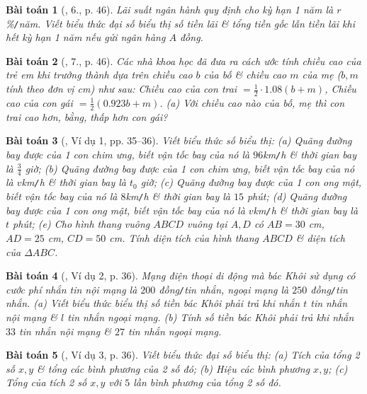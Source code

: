 \documentclass{article}
\newtheorem{baitoan}{Bài toán}
\begin{document}
\begin{baitoan}[\cite{SGK_Toan_7_Canh_Dieu_tap_2}, 6., p. 46]
	Lãi suất ngân hành quy định cho kỳ hạn 1 năm là $r$\%\emph{\texttt{/}}năm. Viết biểu thức đại số biểu thị số tiền lãi \& tổng tiền gốc lẫn tiền lãi khi hết kỳ hạn 1 năm nếu gửi ngân hàng $A$ đồng.
\end{baitoan}

\begin{baitoan}[\cite{SGK_Toan_7_Canh_Dieu_tap_2}, 7., p. 46]
	Các nhà khoa học đã đưa ra cách ước tính chiều cao của trẻ em khi trưởng thành dựa trên chiều cao $b$ của bố \& chiều cao $m$ của mẹ ($b,m$ tính theo đơn vị cm) như sau: Chiều cao của con trai $= \frac{1}{2}\cdot1.08(b + m)$, Chiều cao của con gái $= \frac{1}{2}(0.923b + m)$. (a) Với chiều cao nào của bố, mẹ thì con trai cao hơn, bằng, thấp hơn con gái?
\end{baitoan}

\begin{baitoan}[\cite{SBT_Toan_7_Canh_Dieu_tap_2}, Ví dụ 1, pp. 35--36]
	Viết biểu thức số biểu thị: (a) Quãng đường bay được của 1 con chim ưng, biết vận tốc bay của nó là $96$\emph{km\texttt{/}h} \& thời gian bay là $\frac{3}{4}$ giờ; (b) Quãng đường bay được của 1 con chim ưng, biết vận tốc bay của nó là $v$\emph{km\texttt{/}h} \& thời gian bay là $t_0$ giờ; (c) Quãng đường bay được của 1 con ong mật, biết vận tốc bay của nó là $8$\emph{km\texttt{/}h} \& thời gian bay là $15$ phút; (d) Quãng đường bay được của 1 con ong mật, biết vận tốc bay của nó là $v$\emph{km\texttt{/}h} \& thời gian bay là $t$ phút; (e) Cho hình thang vuông $ABCD$ vuông tại $A,D$ có $AB = 30$ \emph{cm}, $AD = 25$ \emph{cm}, $CD = 50$ \emph{cm}. Tính diện tích của hình thang $ABCD$ \& diện tích của $\Delta ABC$.
\end{baitoan}

\begin{baitoan}[\cite{SBT_Toan_7_Canh_Dieu_tap_2}, Ví dụ 2, p. 36]
	Mạng điện thoại di động mà bác Khôi sử dụng có cước phí nhắn tin nội mạng là $200$ đồng\emph{\texttt{/}}tin nhắn, ngoại mạng là $250$ đồng\emph{\texttt{/}}tin nhắn. (a) Viết biểu thức biểu thị số tiền bác Khôi phải trả khi nhắn $t$ tin nhắn nội mạng \& $l$ tin nhắn ngoại mạng. (b) Tính số tiền bác Khôi phải trả khi nhắn $33$ tin nhắn nội mạng \& $27$ tin nhắn ngoại mạng.
\end{baitoan}

\begin{baitoan}[\cite{SBT_Toan_7_Canh_Dieu_tap_2}, Ví dụ 3, p. 36]
	Viết biểu thức đại số biểu thị: (a) Tích của tổng 2 số $x,y$ \& tổng các bình phương của 2 số đó; (b) Hiệu các bình phương $x,y$; (c) Tổng của tích 2 số $x,y$ với $5$ lần bình phương của tổng 2 số đó.
\end{baitoan}
\end{document}
